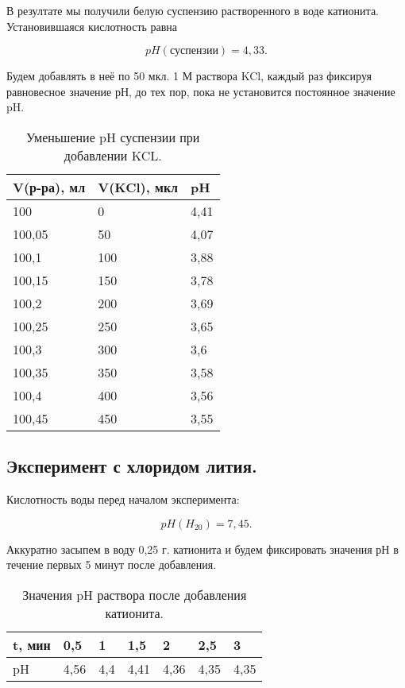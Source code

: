 \documentclass[a4paper,12pt]{article} %
\begin{document}
В резултате мы получили белую суспензию растворенного в воде катионита. Установившаяся кислотность равна 
 
 \begin{equation*}
     pH(\textit{суспензии}) = 4,33.
 \end{equation*}


Будем добавлять в неё по 50 мкл. 1 М раствора KCl,
каждый раз фиксируя равновесное значение рН, до тех пор, пока не установится постоянное значение pH.

\begin{table}[H]
    \centering
    \begin{tabular}{|l|l|l|}
    \hline
        V(р-ра), мл & V(KCl), мкл & pH \\ \hline
        100 & 0 & 4,41 \\ \hline
        100,05 & 50 & 4,07 \\ \hline
        100,1 & 100 & 3,88 \\ \hline
        100,15 & 150 & 3,78 \\ \hline
        100,2 & 200 & 3,69 \\ \hline
        100,25 & 250 & 3,65 \\ \hline
        100,3 & 300 & 3,6 \\ \hline
        100,35 & 350 & 3,58 \\ \hline
        100,4 & 400 & 3,56 \\ \hline
        100,45 & 450 & 3,55 \\ \hline
    \end{tabular}
    \caption{Уменьшение pH суспензии при добавлении KCL.}
\end{table}

\subsection{Эксперимент с хлоридом лития.}

Кислотность воды перед началом эксперимента:

\begin{equation*}
    pH (H_20)= 7,45.
\end{equation*}

Аккуратно засыпем в воду 0,25 г. катионита и будем фиксировать значения рН в течение первых 5 минут после добавления.

\begin{table}[H]
    \centering
     \begin{tabular}{|l|l|l|l|l|l|l|}
    \hline
        t, мин & 0,5 & 1 & 1,5 & 2 & 2,5 & 3 \\ \hline
        pH & 4,56 & 4,4 & 4,41 & 4,36 & 4,35 & 4,35 \\ \hline
    \end{tabular}
     \caption{Значения pH раствора после добавления катионита.}
\end{table}
\end{document}
